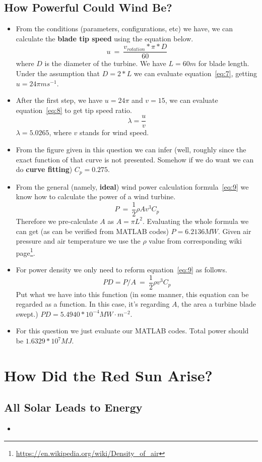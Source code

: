 \documentclass[12pt]{article}
\begin{document}
\subsection{How Powerful Could Wind Be?}
\label{sec:how-powerful-could}

\begin{itemize}
\item From the conditions (parameters, configurations, etc) we have,
  we can calculate the \textbf{blade tip speed} using the equation
  below.
  \begin{equation}
    \label{eq:7}
    u~=~\frac{v_{rotation}*\pi*D}{60}
  \end{equation}
  where $D$ is the diameter of the turbine. We have $L=60m$ for blade
  length. Under the assumption that $D=2*L$ we can evaluate
  equation~\eqref{eq:7}, getting $u=24\pi ms^{-1}$.
\item After the first step, we have $u=24\pi$ and $v=15$, we can
  evaluate equation~\eqref{eq:8} to get tip speed ratio.
  \begin{equation}
    \label{eq:8}
    \lambda=\frac{u}{v}
  \end{equation}
  $\lambda=5.0265$, where $v$ stands for wind speed.
\item From the figure given in this question we can infer (well,
  roughly since the exact function of that curve is not
  presented. Somehow if we do want we can do \textbf{curve fitting})
  $C_{p}=0.275$.
\item From the general (namely, \textbf{ideal}) wind power calculation
  formula~\eqref{eq:9} we know how to calculate the power of a wind
  turbine.
  \begin{equation}
    \label{eq:9}
    P~=~\frac{1}{2}\rho Av^{3}C_{p}
  \end{equation}
  Therefore we pre-calculate $A$ as $A=\pi L^{2}$. Evaluating the
  whole formula we can get (as can be verified from MATLAB codes)
  $P=6.2136MW$. Given air pressure and air temperature we use the
  $\rho$ value from corresponding wiki
  page\footnote{\url{https://en.wikipedia.org/wiki/Density_of_air}}. 
\item For power density we only need to reform equation~\eqref{eq:9}
  as follows.
  \begin{equation}
    \label{eq:10}
    PD=P/A~=~\frac{1}{2}\rho v^{3}C_{p}
  \end{equation}
  Put what we have into this function (in some manner, this equation
  can be regarded as a function. In this case, it's regarding $A$, the
  area a turbine blade swept.) $PD=5.4940*10^{-4}MW\cdot m^{-2}$.
\item For this question we just evaluate our MATLAB codes. Total power
  should be $1.6329*10^{7}MJ$.
\end{itemize}

\section{How Did the Red Sun Arise?}
\label{sec:how-did-red}

\subsection{All Solar Leads to Energy}
\label{sec:all-solar-leads}

\begin{itemize}
\item 
\end{itemize}
\end{document}
